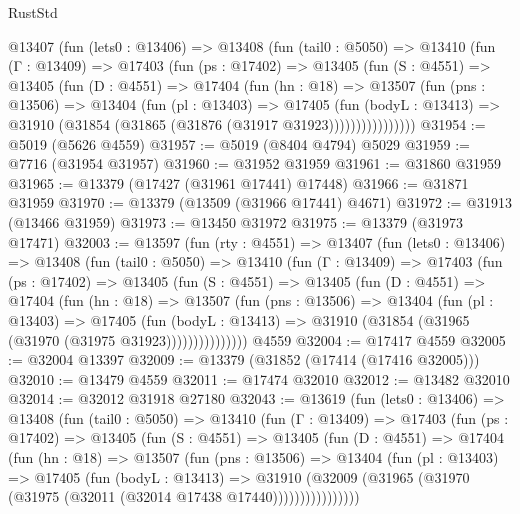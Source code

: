 \begin{lexlean}{RustStd}
\begin{coremodule}
      @13407
        (fun (lets0 : @13406) =>
        @13408
          (fun (tail0 : @5050) =>
          @13410
            (fun (Γ : @13409) =>
            @17403
              (fun (ps : @17402) =>
              @13405
                (fun (S : @4551) =>
                @13405
                  (fun (D : @4551) =>
                  @17404
                    (fun (hn : @18) =>
                    @13507
                      (fun (pns : @13506) =>
                      @13404
                        (fun (pl : @13403) =>
                        @17405
                          (fun (bodyL : @13413) =>
                          @31910 (@31854 (@31865 (@31876 (@31917 @31923))))))))))))))))
@31954 := @5019 (@5626 @4559)
@31957 := @5019 (@8404 @4794) @5029
@31959 := @7716 (@31954 @31957)
@31960 := @31952 @31959
@31961 := @31860 @31959
@31965 := @13379 (@17427 (@31961 @17441) @17448)
@31966 := @31871 @31959
@31970 := @13379 (@13509 (@31966 @17441) @4671)
@31972 := @31913 (@13466 @31959)
@31973 := @13450 @31972
@31975 := @13379 (@31973 @17471)
@32003 := @13597
    (fun (rty : @4551) =>
    @13407
      (fun (lets0 : @13406) =>
      @13408
        (fun (tail0 : @5050) =>
        @13410
          (fun (Γ : @13409) =>
          @17403
            (fun (ps : @17402) =>
            @13405
              (fun (S : @4551) =>
              @13405
                (fun (D : @4551) =>
                @17404
                  (fun (hn : @18) =>
                  @13507
                    (fun (pns : @13506) =>
                    @13404
                      (fun (pl : @13403) =>
                      @17405
                        (fun (bodyL : @13413) =>
                        @31910 (@31854 (@31965 (@31970 (@31975 @31923)))))))))))))))
    @4559
@32004 := @17417 @4559
@32005 := @32004 @13397
@32009 := @13379 (@31852 (@17414 (@17416 @32005)))
@32010 := @13479 @4559
@32011 := @17474 @32010
@32012 := @13482 @32010
@32014 := @32012 @31918 @27180
@32043 := @13619
    (fun (lets0 : @13406) =>
    @13408
      (fun (tail0 : @5050) =>
      @13410
        (fun (Γ : @13409) =>
        @17403
          (fun (ps : @17402) =>
          @13405
            (fun (S : @4551) =>
            @13405
              (fun (D : @4551) =>
              @17404
                (fun (hn : @18) =>
                @13507
                  (fun (pns : @13506) =>
                  @13404
                    (fun (pl : @13403) =>
                    @17405
                      (fun (bodyL : @13413) =>
                      @31910
                        (@32009
                          (@31965 (@31970 (@31975 (@32011 (@32014 @17438 @17440))))))))))))))))

\end{coremodule}
\end{lexlean}
